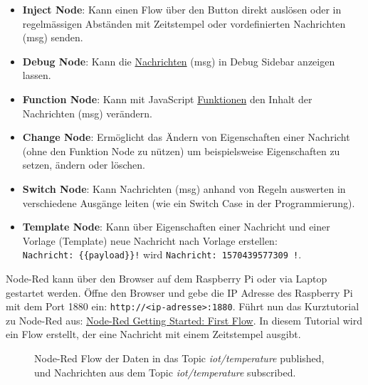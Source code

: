 \documentclass[
  11pt,
  a4paper,
  oneside, openany  ,captions=tableheading
]{scrbook}
\providecommand{\tightlist}{%
  \setlength{\itemsep}{0pt}\setlength{\parskip}{0pt}}
\theoremstyle{remark}
\begin{document}
\begin{itemize}
\tightlist
\item
  \textbf{Inject Node}: Kann einen Flow über den Button direkt auslösen
  oder in regelmässigen Abständen mit Zeitstempel oder vordefinierten
  Nachrichten (msg) senden.
\item
  \textbf{Debug Node}: Kann die
  \href{https://nodered.org/docs/user-guide/messages}{Nachrichten} (msg)
  in Debug Sidebar anzeigen lassen.
\item
  \textbf{Function Node}: Kann mit JavaScript
  \href{https://nodered.org/docs/user-guide/writing-functions}{Funktionen}
  den Inhalt der Nachrichten (msg) verändern.
\item
  \textbf{Change Node}: Ermöglicht das Ändern von Eigenschaften einer
  Nachricht (ohne den Funktion Node zu nützen) um beispielsweise
  Eigenschaften zu setzen, ändern oder löschen.
\item
  \textbf{Switch Node}: Kann Nachrichten (msg) anhand von Regeln
  auswerten in verschiedene Ausgänge leiten (wie ein Switch Case in der
  Programmierung).
\item
  \textbf{Template Node}: Kann über Eigenschaften einer Nachricht und
  einer Vorlage (Template) neue Nachricht nach Vorlage erstellen:
  \texttt{Nachricht:\ \{\{payload\}\}!} wird
  \texttt{Nachricht:\ 1570439577309\ !}.
\end{itemize}

Node-Red kann über den Browser auf dem Raspberry Pi oder via Laptop
gestartet werden. Öffne den Browser und gebe die IP Adresse des
Raspberry Pi mit dem Port 1880 ein:
\texttt{http://\textless{}ip-adresse\textgreater{}:1880}. Führt nun das
Kurztutorial zu Node-Red aus:
\href{https://nodered.org/docs/getting-started/first-flow}{Node-Red
Getting Started: First Flow}. In diesem Tutorial wird ein Flow erstellt,
der eine Nachricht mit einem Zeitstempel ausgibt.

\begin{figure}


\caption{\label{fig-noderedmqttflow}Node-Red Flow der Daten in das Topic
\emph{iot/temperature} published, und Nachrichten aus dem Topic
\emph{iot/temperature} subscribed.}

\end{figure}%
\end{document}
